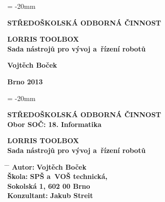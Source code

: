 \documentclass[12pt, a4paper, oneside]{article}
\newcommand{\B}{\textbf} %
\begin{document}

\pagestyle{empty} %
 
\voffset = -20mm %
\enlargethispage{60mm} %

\begin{center}
 
\Large \B{STŘEDOŠKOLSKÁ ODBORNÁ ČINNOST}

\vspace{60mm}

\huge %
\B{LORRIS TOOLBOX \\ Sada nástrojů pro vývoj a~řízení robotů}

\Large

\vspace{90mm}


\B{Vojtěch Boček} \\

\vspace{40mm}

\B{Brno 2013}


\end{center}

\newpage %

\voffset = -20mm %
\enlargethispage{60mm} %

\begin{center}

\Large \B{STŘEDOŠKOLSKÁ ODBORNÁ ČINNOST}  \\
\vspace{10mm}
 \normalsize 
\B{Obor SOČ: 18. Informatika}%

\vspace{45mm}

\LARGE %
\B{LORRIS TOOLBOX \\ Sada nástrojů pro vývoj a~řízení robotů}%
\end{center}  
\large

\vspace{50mm}


\begin{tabbing}
\hspace{10mm} \= \hspace{30mm}  \=   \kill %
  \> \B{Autor:}  \> \B{Vojtěch Boček}        \\[8mm] 
  \> \B{Škola:}   \> \B{SPŠ a~VOŠ technická, }     \\
  \>              \> \B{Sokolská 1, 602 00 Brno}    \\[8mm]

  \> \B{Konzultant:} \> \B {Jakub Streit} 
\end{tabbing}
\end{document}
